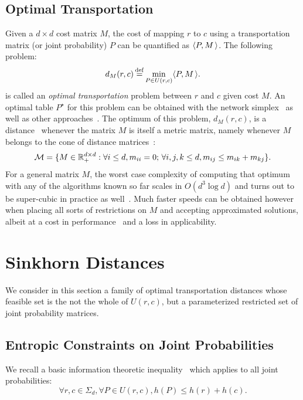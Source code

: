 \documentclass{amsart} %
\begin{document}
\subsection{Optimal Transportation} Given a $d\times d$ cost matrix $M$, the cost of mapping $r$ to $c$ using a transportation matrix (or joint probability) $P$ can be quantified  as $\langle P , M\,\rangle$. The following problem:
$$
d_M(r,c) \operatorname{\overset{\operatorname{def}}{=}} \min_{P\in U(r,c)} \langle P , M\,\rangle.
$$
is called an \emph{optimal transportation} problem between $r$ and $c$ given cost $M$. An optimal table $P^\star$ for this problem can be obtained with the network simplex~\citep[\S9]{ahuja1993network} as well as other approaches~\citep{orlin1993faster}. The optimum of this problem, $d_M(r,c)$, is a distance~\citep[\S6.1]{villani09} whenever the matrix $M$ is itself a metric matrix, namely whenever $M$ belongs to the cone of distance matrices~\citep{avis1980extreme,brickell2008metric}:
$$\mathcal{M}=\{M\in\mathbb{R}^{d\times d}_+:\forall i\leq d, m_{ii}=0;\, \forall i,j,k\leq d, m_{ij}\leq m_{ik} + m_{kj}\}.$$
For a general matrix $M$, the worst case complexity of computing that optimum with any of the algorithms known so far scales in $O(d^3\log d)$ and turns out to be super-cubic in practice as well~\citep[\S2.1]{Pele-iccv2009}. Much faster speeds can be obtained however when placing all sorts of restrictions on $M$ and accepting approximated solutions, albeit at a cost in performance~\citep{GraumanD04} and a loss in applicability.


\section{Sinkhorn Distances}\label{sec:grav}
We consider in this section a family of optimal transportation distances whose feasible set is the not the whole of $U(r,c)$, but a parameterized restricted set of joint probability matrices.

\subsection{Entropic Constraints on Joint Probabilities}
We recall a basic information theoretic inequality~\citep[\S2]{cover91elements} which applies to all joint probabilities: 
\begin{equation}\label{eq:basic}
	\forall r,c \in \Sigma_d, \forall P\in U(r,c), h(P) \leq h(r)+h(c).
\end{equation}
\end{document}
